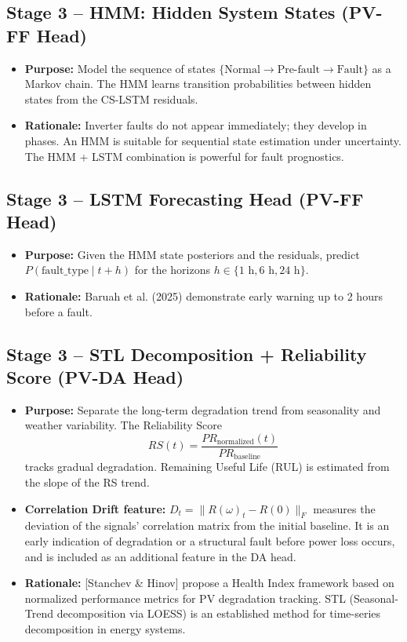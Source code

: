 \documentclass[11pt,a4paper]{article}
\begin{document}
\subsection*{Stage 3 -- HMM: Hidden System States (PV-FF Head)}
\begin{itemize}
    \item \textbf{Purpose:} Model the sequence of states $\{\text{Normal} \rightarrow \text{Pre-fault} \rightarrow \text{Fault}\}$ as a Markov chain. The HMM learns transition probabilities between hidden states from the CS-LSTM residuals.
    \item \textbf{Rationale:} Inverter faults do not appear immediately; they develop in phases. An HMM is suitable for sequential state estimation under uncertainty. The HMM + LSTM combination is powerful for fault prognostics.
\end{itemize}

\subsection*{Stage 3 -- LSTM Forecasting Head (PV-FF Head)}
\begin{itemize}
    \item \textbf{Purpose:} Given the HMM state posteriors and the residuals, predict $P(\text{fault\_type}\mid t+h)$ for the horizons $h \in \{1\text{ h}, 6\text{ h}, 24\text{ h}\}$.
    \item \textbf{Rationale:} Baruah et al. (2025) demonstrate early warning up to 2 hours before a fault.
\end{itemize}

\subsection*{Stage 3 -- STL Decomposition + Reliability Score (PV-DA Head)}
\begin{itemize}
    \item \textbf{Purpose:} Separate the long-term degradation trend from seasonality and weather variability. The Reliability Score
    \[
        RS(t) = \frac{PR_{\mathrm{normalized}}(t)}{PR_{\mathrm{baseline}}}
    \]
    tracks gradual degradation. Remaining Useful Life (RUL) is estimated from the slope of the RS trend.
    \item \textbf{Correlation Drift feature:} $D_t = \lVert R(\omega)_t - R(0)\rVert_F$ measures the deviation of the signals' correlation matrix from the initial baseline. It is an early indication of degradation or a structural fault before power loss occurs, and is included as an additional feature in the DA head.
    \item \textbf{Rationale:} [Stanchev \& Hinov] propose a Health Index framework based on normalized performance metrics for PV degradation tracking. STL (Seasonal-Trend decomposition via LOESS) is an established method for time-series decomposition in energy systems.
\end{itemize}
\end{document}
